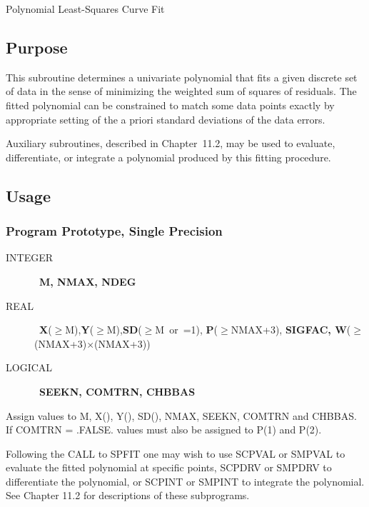 \documentclass[twoside]{MATH77}
\begin{document}
 Polynomial Least-Squares Curve Fit


\subsection{Purpose}

This subroutine determines a univariate polynomial that fits a given discrete
set of data in the sense of minimizing the weighted sum of squares of residuals.
The fitted polynomial can be constrained to match some data points exactly
by appropriate setting of the a priori standard deviations of the data
errors.

Auxiliary subroutines, described in Chapter~11.2, may be used to evaluate,
differentiate, or integrate a polynomial produced by this fitting procedure.

\subsection{Usage}

\subsubsection{Program Prototype, Single Precision}
\begin{description}
\item[INTEGER]  \ {\bf M, NMAX, NDEG}

\item[REAL]  \ {\bf X}($\geq $M),{\bf Y}($\geq $M),{\bf SD}($\geq $M~or~=1),%
{\bf P}($\geq $NMAX+3), {\bf SIGFAC, W}($\geq$(NMAX+3)$\times $(NMAX+3))

\item[LOGICAL]  \ {\bf SEEKN, COMTRN, CHBBAS}
\end{description}
Assign values to M, X(), Y(), SD(), NMAX, SEEKN, COMTRN and CHBBAS. If
COMTRN = .FALSE. values must also be assigned to P(1) and P(2).%
\begin{center}
\end{center}
Following the CALL to SPFIT one may wish to use SCPVAL or SMPVAL to evaluate
the fitted polynomial at specific points, SCPDRV or SMPDRV to differentiate
the polynomial, or SCPINT or SMPINT to integrate the polynomial. See Chapter
11.2 for descriptions of these subprograms.
\end{document}
